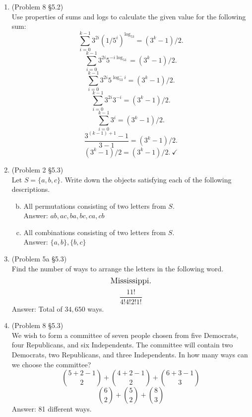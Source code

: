 \documentclass[12pt]{article}
\begin{document}
\begin{enumerate}


\item (Problem 8 \S 5.2)\\
Use properties of sums and logs to calculate the given value for the following sum:
\[\sum_{i=0}^{k-1}3^{2i}(1/5^i)^{\log_53}=(3^k-1)/2.\]
\[\sum_{i=0}^{k-1}3^{2i}5^{-i\log_53}=(3^k-1)/2.\]
\[\sum_{i=0}^{k-1}3^{2i}5^{\log_53^-i}=(3^k-1)/2.\]
\[\sum_{i=0}^{k-1}3^{2i}3^{-i}=(3^k-1)/2.\]
\[\sum_{i=0}^{k-1}3^{i}=(3^k-1)/2.\]
\[\frac{3^{(k-1)+1}-1}{3-1}=(3^k-1)/2.\]
\[(3^k-1)/2=(3^k-1)/2.\ \checkmark\]




\item (Problem 2 \S 5.3)\\
Let $S=\{a,b,c\}$. Write down the objects satisfying each of the following descriptions.
\begin{enumerate}[a.]
\setcounter{enumii}{1}
\item All permutations consisting of two letters from $S$. \\
Answer: $ab, ac, ba, bc, ca, cb$
\item All combinations consisting of two letters from $S$. \\ 
Answer: $\{a,b\}, \{b,c\}$
\end{enumerate}










\item (Problem 5a \S 5.3)\\
Find the number of ways to arrange the letters in the following word.
\[\text{\large Mississippi.}\]
\[ \frac{11!}{4!4!2!1!}\]
Answer: Total of $34,650$ ways.











\item (Problem 8 \S 5.3)\\
We wish to form a committee of seven people chosen from five Democrats, four Republicans, and six Independents. The committee will contain two Democrats, two Republicans, and three Independents. In how many ways can we choose the committee?
\[\binom{5+2-1}{2}+\binom{4+2-1}{2}+\binom{6+3-1}{3}\]
\[\binom{6}{2}+\binom{5}{2}+\binom{8}{3}\]
Answer: 81 different ways.






\end{enumerate}
\end{document}
